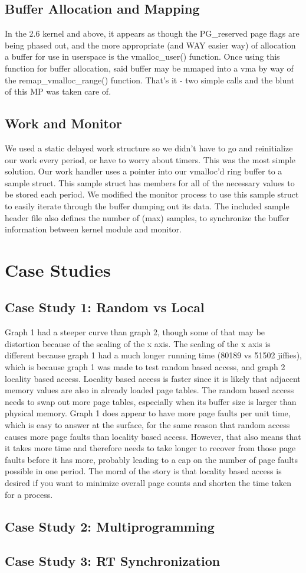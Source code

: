\documentclass{article}
\begin{document}
\subsection{Buffer Allocation and Mapping}
In the 2.6 kernel and above, it appears as though the PG\_reserved page flags are being phased out, and the more appropriate (and WAY easier way) of allocation a buffer for use in userspace is the vmalloc\_user() function. Once using this function for buffer allocation, said buffer may be mmaped into a vma by way of the remap\_vmalloc\_range() function. That's it - two simple calls and the blunt of this MP was taken care of.

\subsection{Work and Monitor}
We used a static delayed work structure so we didn't have to go and reinitialize our work every period, or have to worry about timers. This was the most simple solution. Our work handler uses a pointer into our vmalloc'd ring buffer to a sample struct. This sample struct has members for all of the necessary values to be stored each period. We modified the monitor process to use this sample struct to easily iterate through the buffer dumping out its data. The included sample header file also defines the number of (max) samples, to synchronize the buffer information between kernel module and monitor.

\section{Case Studies}

\subsection{Case Study 1: Random vs Local}
Graph 1 had a steeper curve than graph 2, though some of that may be distortion because of the scaling of the x axis. The scaling of the x axis is different because graph 1 had a much longer running time (80189 vs 51502 jiffies), which is because graph 1 was made to test random based access, and graph 2 locality based access. Locality based access is faster since it is likely that adjacent memory values are also in already loaded page tables. The random based access needs to swap out more page tables, especially when its buffer size is larger than physical memory. Graph 1 does appear to have more page faults per unit time, which is easy to answer at the surface, for the same reason that random access causes more page faults than locality based access. However, that also means that it takes more time and therefore needs to take longer to recover from those page faults before it has more, probably leading to a cap on the number of page faults possible in one period. The moral of the story is that locality based access is desired if you want to minimize overall page counts and shorten the time taken for a process.

\subsection{Case Study 2: Multiprogramming}

\subsection{Case Study 3: RT Synchronization}
\end{document}
